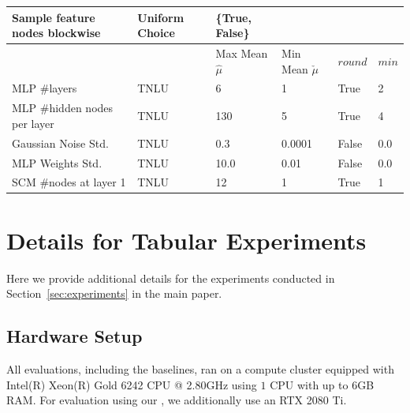 \documentclass{article}
\begin{document}
\begin{table}[htbp]
\begin{tabular}{llllll}
    Sample feature nodes blockwise          &                     Uniform Choice &                                      \{True, False\} & & &  \\
    \toprule
    {} &  & Max Mean $\hat{\mu}$ & Min Mean $\check{\mu}$ & $round$ & $min$ \\
    \midrule
    MLP \#layers                 &      TNLU &        6 &        1 &        True &           2 \\
    MLP \#hidden nodes per layer &      TNLU &      130 &        5 &        True &           4 \\
    Gaussian Noise Std.          &      TNLU &      0.3 &   0.0001 &       False &         0.0 \\
    MLP Weights Std.             &      TNLU &     10.0 &     0.01 &       False &         0.0 \\
    SCM \#nodes at layer 1        &     TNLU &       12 &        1 &        True &           1 \\
    \bottomrule
    \end{tabular}
    \label{tab:diffable_hps}
\end{table}


\section{Details for Tabular Experiments}\label{app:expdetails}

Here we provide additional details for the experiments conducted in Section~\ref{sec:experiments} in the main paper. 

\subsection{Hardware Setup} \label{app:ssec:hardware}
All evaluations, including the baselines, ran on a compute cluster equipped with Intel(R) Xeon(R) Gold 6242 CPU @ 2.80GHz using $1$ CPU with up to $6$GB RAM. For evaluation using our \methodname{}, we additionally use an RTX 2080 Ti.
\end{document}
